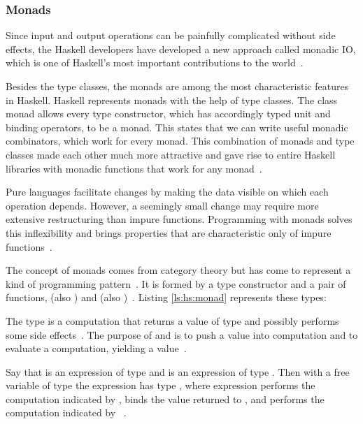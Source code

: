 \begin{frame}\frametitle{Monads}

Since input and output operations can be painfully complicated without side effects, the Haskell developers have developed a new approach called monadic IO, which is one of Haskell's most important contributions to the world~\cite{history-of-haskell}.

Besides the type classes, the monads are among the most characteristic features in Haskell. Haskell represents monads with the help of type classes. The class monad allows every type constructor, which has accordingly typed unit and binding operators, to be a monad. 
This states that we can write useful monadic combinators, which work for every monad. 
This combination of monads and type classes made each other much more attractive and gave rise to entire Haskell libraries with monadic functions that work for any monad~\cite{history-of-haskell}. 


Pure languages facilitate changes by making the data visible on which each operation depends. However, a seemingly small change may require more extensive restructuring than impure functions.  Programming with monads solves this inflexibility and brings properties that are characteristic only of impure functions~\cite{essence-of-fp}.

The concept of monads comes from category theory but has come to represent a kind of programming pattern~\cite{essence-of-fp,history-of-haskell}. It  is formed by a type constructor  and a pair of functions,  (also ) and  (also \expr{>>=})~\cite{history-of-haskell,essence-of-fp}. Listing \ref{ls:hs:monad} represents these types:

The type  is a computation that returns a value of type  and possibly performs some side effects~\cite{history-of-haskell}. The purpose of  and  is to push a value into computation and to evaluate a computation, yielding a value~\cite{essence-of-fp}.

Say that  is an expression of type  and  is an expression of type . Then with a free variable  of type  the expression  has type , where expression performs the computation indicated by , binds the value returned to , and performs the computation indicated by ~\cite{history-of-haskell}.


\end{frame}
